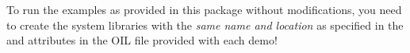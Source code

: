 \begin{warning}
To run the examples as provided in this package without modifications,
you need to create the system libraries with the {\em same name and
location} as specified in the  and
 attributes in the OIL file provided with
each demo!
\end{warning}






